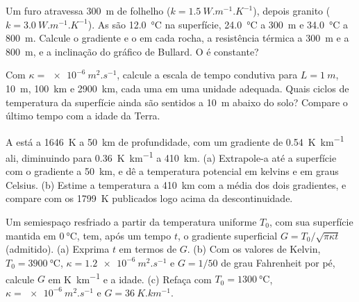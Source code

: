 \begin{exercise}[$\star\star$]\label{exo:b1:heat-budget:6}
Um furo atravessa \qty{300}{m} de folhelho ($k = \qty{1.5}{W.m^{-1}.K^{-1}}$), depois
granito ($k = \qty{3.0}{W.m^{-1}.K^{-1}}$). As  são
\qty{12.0}{\degreeCelsius} na superfície, \qty{24.0}{\degreeCelsius} a
\qty{300}{m} e \qty{34.0}{\degreeCelsius} a \qty{800}{m}. Calcule o
gradiente e o  em cada rocha, a resistência térmica a \qty{300}{m}
e a \qty{800}{m}, e a inclinação do gráfico de Bullard. O  é
constante?
\end{exercise}

\begin{exercise}[$\star\star$]\label{exo:b1:heat-budget:7}
Com $\kappa = \qty{e-6}{m^2.s^{-1}}$, calcule a escala de tempo condutiva para
$L = \qty{1}{m}$, \qty{10}{m}, \qty{100}{km} e \qty{2900}{km}, cada uma em uma
unidade adequada. Quais ciclos de temperatura da superfície ainda são sentidos a \qty{10}{m} abaixo do
solo? Compare o último tempo com a idade da Terra.
\end{exercise}

\begin{exercise}[$\star\star$]\label{exo:b1:heat-budget:8}
A  está a \qty{1646}{K} a \qty{50}{km} de profundidade, com um gradiente de
\qty{0.54}{K.km^{-1}} ali, diminuindo para \qty{0.36}{K.km^{-1}} a \qty{410}{km}.
(a) Extrapole-a até a superfície com o gradiente a \qty{50}{km}, e dê a temperatura
potencial em kelvins e em graus Celsius. (b) Estime a temperatura a \qty{410}{km}
com a média dos dois gradientes, e compare com os \qty{1799}{K} publicados logo acima
da descontinuidade.
\end{exercise}

\begin{exercise}[$\star\star$]\label{exo:b1:heat-budget:9}
Um semiespaço resfriado a partir da temperatura uniforme $T_0$, com sua superfície
mantida em $\qty{0}{\degreeCelsius}$, tem, após um tempo $t$, o gradiente superficial $G =
T_0/\sqrt{\pi\kappa t}$ (admitido). (a) Exprima $t$ em termos de $G$. (b) Com os
valores de Kelvin, $T_0 = \qty{3900}{\degreeCelsius}$, $\kappa =
\qty{1.2e-6}{m^2.s^{-1}}$ e $G = 1/50$ de grau Fahrenheit por pé, calcule $G$ em
\unit{K.km^{-1}} e a idade. (c) Refaça com $T_0 =
\qty{1300}{\degreeCelsius}$, $\kappa = \qty{e-6}{m^2.s^{-1}}$ e $G =
\qty{36}{K.km^{-1}}$.
\end{exercise}

